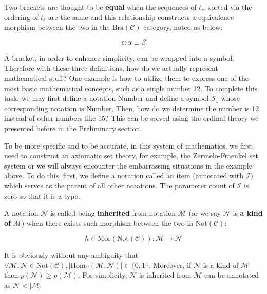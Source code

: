 \documentclass{article}
\begin{document}
Two brackets are thought to be \textbf{ equal} when the sequences of \(t_{\mathit{r}}\), sorted via the ordering of \(t_{\ell }\) are the same and this relationship constructs a equivalence morphism between the two in the \(\text{Bra}(\mathcal{C})\) category, noted as below:

\[\epsilon :\alpha \equiv \beta\]

A bracket, in order to enhance simplicity, can be wrapped into a symbol. Therefore with these three definitions, how do we actually represent mathematical stuff? One example is how to utilize them to express one of the most basic mathematical concepts, such as a single number 12. To complete this task, we may first define a notation Number and define a symbol \(\mathcal{S}_1\) whose corresponding notation is Number. Then, how do we determine the number is 12 instead of other numbers like 15? This can be solved using the ordinal theory we presented before in the Preliminary section.

To be more specific and to be accurate, in this system of mathematics, we first need to construct an axiomatic set theory, for example, the Zermelo-Fraenkel set system or we will always encounter the embarrassing situations in the example above. To do this, first, we define a notation called an item (annotated with \(\mathcal{I}\)) which serves as the parent of all other notations. The parameter count of \(\mathcal{I}\) is zero so that it is a type.

 A notation \(\mathcal{N}\) is called being \textbf{ inherited} from notation \(\mathcal{M}\) (or we say \(\mathcal{N}\) is\textbf{  a kind of} \(\mathcal{M}\)) when there exists such morphism between the two in \(\text{Not}(\mathcal{C})\):

\[h\in \text{Mor}(\text{Not}(\mathcal{C})): \mathcal{M}\to \mathcal{N}\]

It is obviously without any ambiguity that \(\forall \mathcal{M},\mathcal{N}\in \text{Not}(\mathcal{C}),\left|\text{Hom}_{\mathcal{C}}(\mathcal{M},\mathcal{N})\right|\in \{0,1\}\). Moreover, if \(\mathcal{N}\) is a kind of \(\mathcal{M}\) then \(\mathit{p}(\mathcal{N})\geq \mathit{p}(\mathcal{M})\). For simplicity, \(\mathcal{N}\) is inherited from \(\mathcal{M}\) can be annotated as \(\mathcal{N}\triangleleft |\mathcal{M}\).
\end{document}
